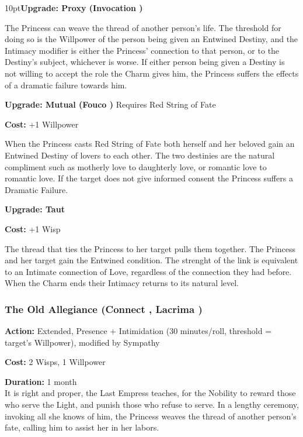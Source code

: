 \begin{myindentpar}{10pt}\textbf{Upgrade: Proxy (Invocation \textbullet\textbullet\textbullet\textbullet)}

The Princess can weave the thread of another person's life. The threshold for doing so is the Willpower of the person being given an Entwined Destiny, and the Intimacy modifier is either the Princess' connection to that person, or to the Destiny's subject, whichever is worse. If either person being given a Destiny is not willing to accept the role the Charm gives him, the Princess suffers the effects of a dramatic failure towards him.

\textbf{Upgrade: Mutual (Fouco \textbullet\textbullet\textbullet\textbullet)}
\noindent Requires Red String of Fate

\noindent \textbf{Cost:} +1 Willpower

When the Princess casts Red String of Fate both herself and her beloved gain an Entwined Destiny of lovers to each other. The two destinies are the natural compliment such as motherly love to daughterly love, or romantic love to romantic love. If the target does not give informed consent the Princess suffers a Dramatic Failure.

\textbf{Upgrade: Taut}

\noindent \textbf{Cost:} +1 Wisp

The thread that ties the Princess to her target pulls them together. The Princess and her target gain the Entwined condition. The strenght of the link is equivalent to an Intimate connection of Love, regardless of the connection they had before. When the Charm ends their Intimacy returns to its natural level.
\end{myindentpar}


\subsubsection*{The Old Allegiance (Connect \textbullet\textbullet\textbullet\textbullet, Lacrima \textbullet\textbullet\textbullet)}

\noindent \textbf{Action:} Extended, Presence + Intimidation (30 minutes/roll, threshold = target's Willpower), modified by Sympathy

\noindent \textbf{Cost:} 2 Wisps, 1 Willpower

\noindent \textbf{Duration:} 1 month\\

\noindent It is right and proper, the Last Empress teaches, for the Nobility to reward those who serve the Light, and punish those who refuse to serve. In a lengthy ceremony, invoking all she knows of him, the Princess weaves the thread of another person's fate, calling him to assist her in her labors.


